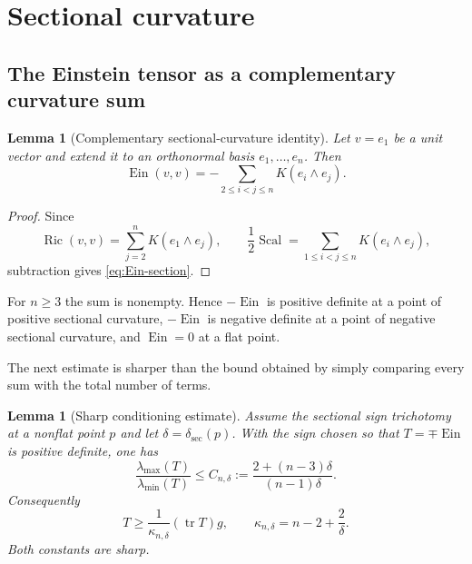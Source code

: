 \documentclass[11pt,reqno]{amsart}
\newtheorem{lemma}[theorem]{Lemma}
\theoremstyle{definition}
\theoremstyle{remark}
\newcommand{\Ric}{\operatorname{Ric}}
\newcommand{\Scal}{\operatorname{Scal}}
\newcommand{\Ein}{\operatorname{Ein}}
\newcommand{\tr}{\operatorname{tr}}
\newcommand{\dsec}{\delta_{\mathrm{sec}}}
\begin{document}
\section{Sectional curvature}\label{sec:sectional}

\subsection{The Einstein tensor as a complementary curvature sum}

\begin{lemma}[Complementary sectional-curvature identity]\label{lem:Ein-section}
Let $v=e_1$ be a unit vector and extend it to an orthonormal basis $e_1,\dots,e_n$.  Then
\begin{equation}\label{eq:Ein-section}
\Ein(v,v)=-\sum_{2\le i<j\le n}K(e_i\wedge e_j).
\end{equation}
\end{lemma}

\begin{proof}
Since
\[
\Ric(v,v)=\sum_{j=2}^nK(e_1\wedge e_j),
\qquad
\frac12\Scal=\sum_{1\le i<j\le n}K(e_i\wedge e_j),
\]
subtraction gives \eqref{eq:Ein-section}.
\end{proof}

For $n\ge3$ the sum is nonempty.  Hence $-\Ein$ is positive definite at a point of positive sectional curvature, $-\Ein$ is negative definite at a point of negative sectional curvature, and $\Ein=0$ at a flat point.

The next estimate is sharper than the bound obtained by simply comparing every sum with the total number of terms.

\begin{lemma}[Sharp conditioning estimate]\label{lem:section-conditioning}
Assume the sectional sign trichotomy at a nonflat point $p$ and let $\delta=\dsec(p)$.  With the sign chosen so that $T=\mp\Ein$ is positive definite, one has
\begin{equation}\label{eq:Cndelta}
\frac{\lambda_{\max}(T)}{\lambda_{\min}(T)}
\le C_{n,\delta}:=
\frac{2+(n-3)\delta}{(n-1)\delta}.
\end{equation}
Consequently
\begin{equation}\label{eq:section-trace-ell}
T\ge\frac1{\kappa_{n,\delta}}(\tr T)g,
\qquad
\kappa_{n,\delta}=n-2+\frac2\delta.
\end{equation}
Both constants are sharp.
\end{lemma}
\end{document}
